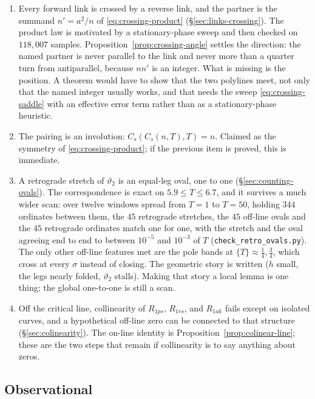 \documentclass[11pt]{article}
\theoremstyle{definition}
\begin{document}
\begin{enumerate}
\item
Every forward link is crossed by a reverse link, and the partner is the
summand $n'=a^{2}/n$ of \eqref{eq:crossing-product}
(\S\ref{sec:links-crossing}).
The product law is motivated by a stationary-phase sweep and then
checked on $118{,}007$ samples.
Proposition~\ref{prop:crossing-angle} settles the direction: the named
partner is never parallel to the link and never more than a quarter turn
from antiparallel, because $nn'$ is an integer. What is missing is the
position. A theorem would have to show that the
two polylines meet, not only that the named integer usually works, and
that needs the sweep \eqref{eq:crossing-saddle} with an effective error
term rather than as a stationary-phase heuristic.

\item
The pairing is an involution: $C_{s}(C_{s}(n,T),T)=n$.
Claimed as the symmetry of \eqref{eq:crossing-product}; if the previous
item is proved, this is immediate.

\item
A retrograde stretch of $\vartheta_2$ is an equal-leg oval, one to one
(\S\ref{sec:counting-ovals}).
The correspondence is exact on $5.9\le T\le 6.7$, and it survives a much
wider scan: over twelve windows spread from $T=1$ to $T=50$, holding $344$
ordinates between them, the $45$ retrograde stretches, the $45$ off-line
ovals and the $45$ retrograde ordinates match one for one, with the stretch
and the oval agreeing end to end to between $10^{-5}$ and $10^{-3}$ of $T$
(\texttt{check\_retro\_ovals.py}). The only other off-line features met are
the pole bands at $\{T\}\approx\tfrac14,\tfrac34$, which cross at every
$\sigma$ instead of closing. The geometric
story is written ($h$ small, the legs nearly folded, $\vartheta_2$
stalls). Making that story a local lemma is one thing; the global
one-to-one is still a scan.

\item
Off the critical line, collinearity of $R_{1ps}$, $R_{1rs}$, and
$R_{1ak}$ fails except on isolated curves, and a hypothetical off-line
zero can be connected to that structure
(\S\ref{sec:colinearity}).
The on-line identity is Proposition~\ref{prop:colinear-line}; these are
the two steps that remain if collinearity is to say anything about
zeros.
\end{enumerate}

\subsection*{Observational}
\end{document}
